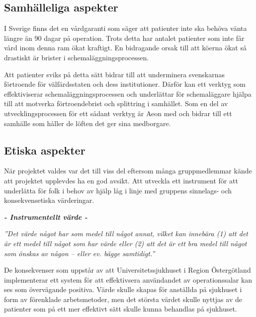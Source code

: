 \subsection{Samhälleliga aspekter}

I Sverige finns det en vårdgaranti som säger att patienter inte ska behöva vänta längre än 90 dagar på operation. Trots detta har antalet patienter som inte får vård inom denna ram ökat kraftigt. En bidragande orsak till att köerna ökat så drastiskt är brister i schemaläggningsprocessen. \cite{vardko}

Att patienter sviks på detta sätt bidrar till att underminera svenskarnas förtroende för välfärdsstaten och dess institutioner. Därför kan ett verktyg som effektiviserar schemaläggningsprocessen och underlättar för schemaläggare hjälpa till att motverka förtroendebrist och splittring i samhället. Som en del av utvecklingsprocessen för ett sådant verktyg är Aeon med och bidrar till ett samhälle som håller de löften det ger sina medborgare.

\subsection{Etiska aspekter}
När projektet valdes var det till viss del eftersom många gruppmedlemmar kände att projektet upplevdes ha en god avsikt. Att utveckla ett instrument för att underlätta för folk i behov av hjälp låg i linje med gruppens sinnelags- och konsekvensetiska värderingar.

\vspace{1em}
\begin{minipage}{1\linewidth}
	\begin{center}
		\textbf{\textit{- Instrumentellt värde -}}
		
		\emph{''Det värde något har som medel till något annat, vilket kan innebära (1) att det är ett medel till något som har värde eller (2) att det är ett bra medel till något som önskas av någon – eller ev. bägge samtidigt.''} \cite{ne}
		
	\end{center}
\end{minipage}

De konsekvenser som uppstår av att Universitetssjukhuset i Region Östergötland implementerar ett system för att effektivsera användandet av operationssalar kan ses som övervägande positiva. Värde skulle skapas för anställda på sjukhuset i form av förenklade arbetsmetoder, men det största värdet skulle nyttjas av de patienter som på ett mer effektivt sätt skulle kunna behandlas på sjukhuset.

